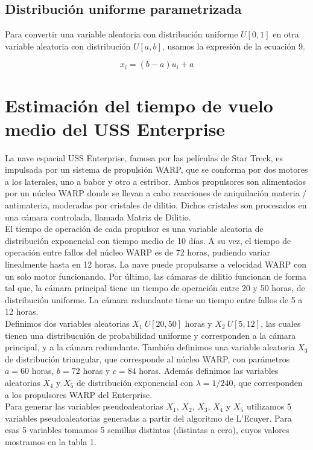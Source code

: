 \documentclass[10pt,journal,compsoc]{IEEEtran}
\begin{document}
\subsection{Distribuci\'on uniforme parametrizada}
Para convertir una variable aleatoria con distribuci\'on uniforme $U[0,1]$ en otra variable aleatoria con distribuci\'on
$U[a, b]$, usamos la expresi\'on de la ecuaci\'on 9.

\begin{equation}
 x_i = (b-a)u_i + a
\end{equation}




\section{Estimaci\'on del tiempo de vuelo medio del USS Enterprise}
La nave espacial USS Enterprise, famosa por las pel\'iculas de Star Treck, es impulsada por un sistema de propulsi\'on WARP, 
que se conforma por dos motores a los laterales, uno a babor y otro a estribor. Ambos propulsores son alimentados por un n\'ucleo WARP
donde se llevan a cabo reacciones de aniquilaci\'on materia / antimateria, moderadas por cristales de dilitio. Dichos cristales 
son procesados en una c\'amara controlada, llamada Matriz de Dilitio.\\
El tiempo de operaci\'on de cada propulsor es una variable aleatoria de distribuci\'on exponencial con tiempo medio de 10 d\'ias. 
A su vez, el tiempo de operaci\'on entre fallos del n\'ucleo WARP es de 72 horas, pudiendo variar linealmente hasta en 12 horas. 
La nave puede propulsarse a velocidad WARP con un solo motor funcionando. Por \'ultimo, las c\'amaras de dilitio funcionan de forma tal que, la c\'amara principal tiene un tiempo de operaci\'on entre 
20 y 50 horas, de distribuci\'on uniforme. La c\'amara redundante tiene un tiempo entre fallos de 5 a 12 horas.\\

\indent Definimos dos variables aleatorias  $X_1~U[20,50]$ horas y $X_2~U[5, 12]$, las cuales tienen una distribucui\'on de probabilidad uniforme y corresponden a la c\'amara principal, y a la c\'amara redundante. Tambi\'en definimos una variable aleatoria $X_3$ de distribuci\'on 
triangular, que corresponde al n\'ucleo WARP, con par\'ametros $a = 60$ horas, $b = 72$ horas y $c = 84$ horas. Adem\'as
definimos las variables aleatorias $X_4$ y $X_5$ de distribuci\'on exponencial con $\lambda=1/240$, que corresponden a los propulsores WARP del Enterprise.\\
\indent Para generar las variables pseudoaleatorias $X_1$, $X_2$, $X_3$, $X_4$ y $X_5$ utilizamos 5 variables pseudoaleatorias generadas
a partir del algoritmo de L'Ecuyer.  Para esas 5 variables tomamos 5 semillas distintas (distintas a cero), cuyos valores mostramos en la tabla 1.
\end{document}
